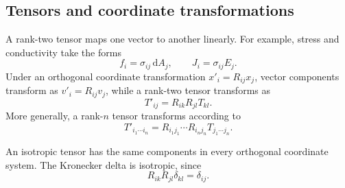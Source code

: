\subsection{Tensors and coordinate transformations}
A rank-two tensor maps one vector to another linearly. For example, stress and conductivity take the forms
\begin{equation}
f_i=\sigma_{ij}\,\mathrm{d}A_j,
\qquad
J_i=\sigma_{ij}E_j.
\end{equation}
Under an orthogonal coordinate transformation $x'_i=R_{ij}x_j$, vector components transform as $v'_i=R_{ij}v_j$, while a rank-two tensor transforms as
\begin{equation}
T'_{ij}=R_{ik}R_{jl}T_{kl}.
\end{equation}
More generally, a rank-$n$ tensor transforms according to
\begin{equation}
T'_{i_1\cdots i_n}
=R_{i_1j_1}\cdots R_{i_nj_n}T_{j_1\cdots j_n}.
\end{equation}

An isotropic tensor has the same components in every orthogonal coordinate system. The Kronecker delta is isotropic, since
\begin{equation}
R_{ik}R_{jl}\delta_{kl}=\delta_{ij}.
\end{equation}

